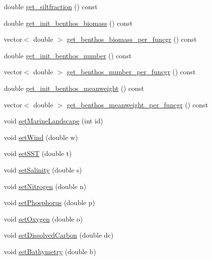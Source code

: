 \begin{DoxyCompactItemize}
\item 
double \mbox{\hyperlink{class_node_data_a29fed1328e789db030143d1eab31f4b4}{get\+\_\+siltfraction}} () const
\item 
double \mbox{\hyperlink{class_node_data_a4bb58802c3b1607a9483a6adac4b2b06}{get\+\_\+init\+\_\+benthos\+\_\+biomass}} () const
\item 
vector$<$ double $>$ \mbox{\hyperlink{class_node_data_a335784d1f1c0392f54480c4736101bda}{get\+\_\+benthos\+\_\+biomass\+\_\+per\+\_\+funcgr}} () const
\item 
double \mbox{\hyperlink{class_node_data_a83a21fc5bd066b25f7454b7a133a4d0d}{get\+\_\+init\+\_\+benthos\+\_\+number}} () const
\item 
vector$<$ double $>$ \mbox{\hyperlink{class_node_data_a91f8cb85d8f0783003bdbde2774791fc}{get\+\_\+benthos\+\_\+number\+\_\+per\+\_\+funcgr}} () const
\item 
double \mbox{\hyperlink{class_node_data_ae3a0fcc6c143f8a0d5188a45293c8044}{get\+\_\+init\+\_\+benthos\+\_\+meanweight}} () const
\item 
vector$<$ double $>$ \mbox{\hyperlink{class_node_data_a26f984f842b7665aed7a771b6dd97a97}{get\+\_\+benthos\+\_\+meanweight\+\_\+per\+\_\+funcgr}} () const
\item 
void \mbox{\hyperlink{class_node_data_aade4b2d620f642cdcb4a60135ce07ac3}{set\+Marine\+Landscape}} (int id)
\item 
void \mbox{\hyperlink{class_node_data_a4aa6a415cd96ce607564cdf91c9a83a4}{set\+Wind}} (double w)
\item 
void \mbox{\hyperlink{class_node_data_a2b9440fd8903a222c1f56e1b347db808}{set\+S\+ST}} (double t)
\item 
void \mbox{\hyperlink{class_node_data_ab7d939f860a614f7b479c73ba57da8c8}{set\+Salinity}} (double s)
\item 
void \mbox{\hyperlink{class_node_data_afa127c82afea0d675bcf60e8c5f71418}{set\+Nitrogen}} (double n)
\item 
void \mbox{\hyperlink{class_node_data_aef48d6de31c265f3ec94a3c4fc81e7e1}{set\+Phosphorus}} (double p)
\item 
void \mbox{\hyperlink{class_node_data_a72f671ec13a3eb8fa0c060296ac5925a}{set\+Oxygen}} (double o)
\item 
void \mbox{\hyperlink{class_node_data_a5381d3a639eae6dfa29fd66dfeb7fd63}{set\+Dissolved\+Carbon}} (double dc)
\item 
void \mbox{\hyperlink{class_node_data_a92d3e674a17f3a431818e34de395f487}{set\+Bathymetry}} (double b)

\end{DoxyCompactItemize}
